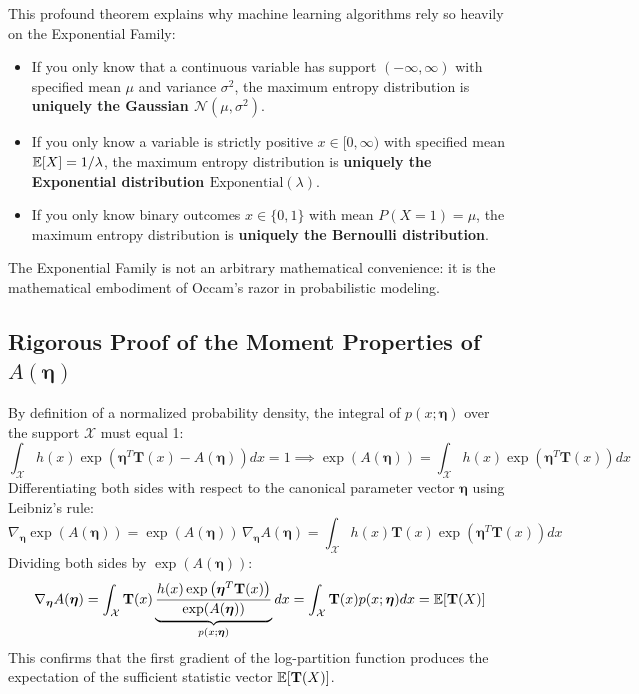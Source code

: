 This profound theorem explains why machine learning algorithms rely so heavily on the Exponential Family:
\begin{itemize}
    \item If you only know that a continuous variable has support $(-\infty, \infty)$ with specified mean $\mu$ and variance $\sigma^2$, the maximum entropy distribution is \textbf{uniquely the Gaussian $\mathcal{N}(\mu, \sigma^2)$}.
    \item If you only know a variable is strictly positive $x \in [0, \infty)$ with specified mean $\operatorname{\mathbb{E}}[X] = 1/\lambda$, the maximum entropy distribution is \textbf{uniquely the Exponential distribution $\text{Exponential}(\lambda)$}.
    \item If you only know binary outcomes $x \in \{0, 1\}$ with mean $P(X=1) = \mu$, the maximum entropy distribution is \textbf{uniquely the Bernoulli distribution}.
\end{itemize}
The Exponential Family is not an arbitrary mathematical convenience: it is the mathematical embodiment of Occam's razor in probabilistic modeling.

\subsection{Rigorous Proof of the Moment Properties of \texorpdfstring{$A(\boldsymbol{\eta})$}{A(eta)}}
By definition of a normalized probability density, the integral of $p(x; \boldsymbol{\eta})$ over the support $\mathcal{X}$ must equal 1:
\begin{equation}
\int_{\mathcal{X}} h(x) \exp\left( \boldsymbol{\eta}^T \mathbf{T}(x) - A(\boldsymbol{\eta}) \right) dx = 1 \implies \exp(A(\boldsymbol{\eta})) = \int_{\mathcal{X}} h(x) \exp\left( \boldsymbol{\eta}^T \mathbf{T}(x) \right) dx
\label{eq:exp_norm}
\end{equation}
Differentiating both sides with respect to the canonical parameter vector $\boldsymbol{\eta}$ using Leibniz's rule:
\begin{equation}
\nabla_{\boldsymbol{\eta}} \exp(A(\boldsymbol{\eta})) = \exp(A(\boldsymbol{\eta})) \, \nabla_{\boldsymbol{\eta}} A(\boldsymbol{\eta}) = \int_{\mathcal{X}} h(x) \mathbf{T}(x) \exp\left( \boldsymbol{\eta}^T \mathbf{T}(x) \right) dx
\end{equation}
Dividing both sides by $\exp(A(\boldsymbol{\eta}))$:
\begin{equation}
\nabla_{\boldsymbol{\eta}} A(\boldsymbol{\eta}) = \int_{\mathcal{X}} \mathbf{T}(x) \underbrace{\frac{h(x) \exp\left( \boldsymbol{\eta}^T \mathbf{T}(x) \right)}{\exp(A(\boldsymbol{\eta}))}}_{p(x; \boldsymbol{\eta})} dx = \int_{\mathcal{X}} \mathbf{T}(x) p(x; \boldsymbol{\eta}) dx = \operatorname{\mathbb{E}}[\mathbf{T}(X)]
\end{equation}
This confirms that the first gradient of the log-partition function produces the expectation of the sufficient statistic vector $\operatorname{\mathbb{E}}[\mathbf{T}(X)]$.

